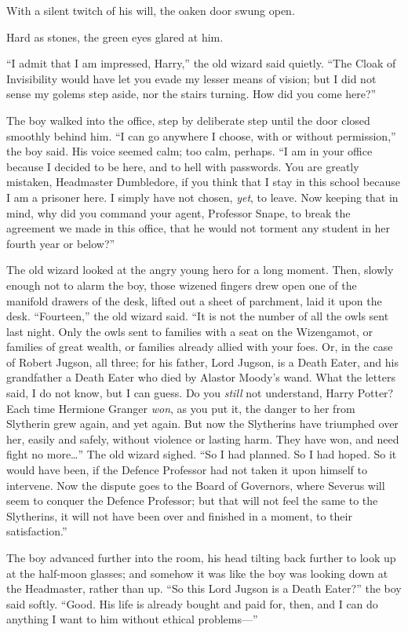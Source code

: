 With a silent twitch of his will, the oaken door swung open.

Hard as stones, the green eyes glared at him.

“I admit that I am impressed, Harry,” the old wizard said quietly. “The Cloak
of Invisibility would have let you evade my lesser means of vision; but I did
not sense my golems step aside, nor the stairs turning. How did you come here?”

The boy walked into the office, step by deliberate step until the door closed
smoothly behind him. “I can go anywhere I choose, with or without permission,”
the boy said. His voice seemed calm; too calm, perhaps. “I am in your office
because I decided to be here, and to hell with passwords. You are greatly
mistaken, Headmaster Dumbledore, if you think that I stay in this school
because I am a prisoner here. I simply have not chosen, \emph{yet}, to leave.
Now keeping that in mind, why did you command your agent, Professor Snape, to
break the agreement we made in this office, that he would not torment any
student in her fourth year or below?”

The old wizard looked at the angry young hero for a long moment. Then, slowly
enough not to alarm the boy, those wizened fingers drew open one of the
manifold drawers of the desk, lifted out a sheet of parchment, laid it upon the
desk. “Fourteen,” the old wizard said. “It is not the number of all the owls
sent last night. Only the owls sent to families with a seat on the Wizengamot,
or families of great wealth, or families already allied with your foes. Or, in
the case of Robert Jugson, all three; for his father, Lord Jugson, is a Death
Eater, and his grandfather a Death Eater who died by Alastor Moody’s wand. What
the letters said, I do not know, but I can guess. Do you \emph{still} not
understand, Harry Potter? Each time Hermione Granger \emph{won}, as you put it,
the danger to her from Slytherin grew again, and yet again. But now the
Slytherins have triumphed over her, easily and safely, without violence or
lasting harm. They have won, and need fight no more…” The old wizard
sighed. “So I had planned. So I had hoped. So it would have been, if the
Defence Professor had not taken it upon himself to intervene. Now the dispute
goes to the Board of Governors, where Severus will seem to conquer the Defence
Professor; but that will not feel the same to the Slytherins, it will not have
been over and finished in a moment, to their satisfaction.”

The boy advanced further into the room, his head tilting back further to look
up at the half-moon glasses; and somehow it was like the boy was looking down
at the Headmaster, rather than up. “So this Lord Jugson is a Death Eater?” the
boy said softly. “Good. His life is already bought and paid for, then, and I
can do anything I want to him without ethical problems—”

